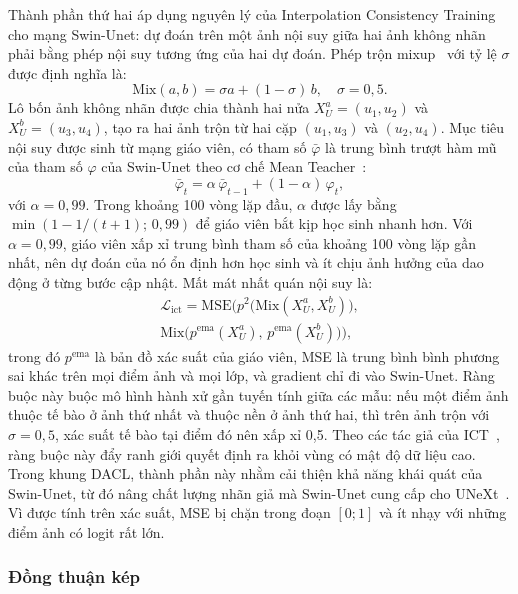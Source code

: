 \documentclass{IEEEtran}
\newcommand{\Lx}[1]{\mathcal{L}_{\mathrm{#1}}}
\newcommand{\Mix}{\mathrm{Mix}}
\begin{document}
Thành phần thứ hai áp dụng nguyên lý của Interpolation Consistency Training~\cite{ict} cho mạng Swin-Unet: dự đoán trên một ảnh nội suy giữa hai ảnh không nhãn phải bằng phép nội suy tương ứng của hai dự đoán. Phép trộn mixup~\cite{mixup} với tỷ lệ $\sigma$ được định nghĩa là:
\begin{equation}
  \Mix(a, b) = \sigma a + (1-\sigma)\, b, \quad \sigma = 0{,}5. \label{eq:mix}
\end{equation}
Lô bốn ảnh không nhãn được chia thành hai nửa $X_U^a=(u_1,u_2)$ và $X_U^b=(u_3,u_4)$, tạo ra hai ảnh trộn từ hai cặp $(u_1,u_3)$ và $(u_2,u_4)$. Mục tiêu nội suy được sinh từ mạng giáo viên, có tham số $\bar{\varphi}$ là trung bình trượt hàm mũ của tham số $\varphi$ của Swin-Unet theo cơ chế Mean Teacher~\cite{mt}:
\begin{equation}
  \bar{\varphi}_t = \alpha\,\bar{\varphi}_{t-1} + (1-\alpha)\,\varphi_t, \label{eq:ema}
\end{equation}
với $\alpha=0{,}99$. Trong khoảng 100 vòng lặp đầu, $\alpha$ được lấy bằng $\min(1-1/(t+1);\,0{,}99)$ để giáo viên bắt kịp học sinh nhanh hơn. Với $\alpha=0{,}99$, giáo viên xấp xỉ trung bình tham số của khoảng 100 vòng lặp gần nhất, nên dự đoán của nó ổn định hơn học sinh và ít chịu ảnh hưởng của dao động ở từng bước cập nhật. Mất mát nhất quán nội suy là:
\begin{multline}
  \Lx{ict} = \mathrm{MSE}\Big(p^{2}\big(\Mix(X_U^a, X_U^b)\big),\\
  \Mix\big(p^{\mathrm{ema}}(X_U^a),\, p^{\mathrm{ema}}(X_U^b)\big)\Big), \label{eq:ict}
\end{multline}
trong đó $p^{\mathrm{ema}}$ là bản đồ xác suất của giáo viên, MSE là trung bình bình phương sai khác trên mọi điểm ảnh và mọi lớp, và gradient chỉ đi vào Swin-Unet. Ràng buộc này buộc mô hình hành xử gần tuyến tính giữa các mẫu: nếu một điểm ảnh thuộc tế bào ở ảnh thứ nhất và thuộc nền ở ảnh thứ hai, thì trên ảnh trộn với $\sigma=0{,}5$, xác suất tế bào tại điểm đó nên xấp xỉ 0,5. Theo các tác giả của ICT~\cite{ict}, ràng buộc này đẩy ranh giới quyết định ra khỏi vùng có mật độ dữ liệu cao. Trong khung DACL, thành phần này nhằm cải thiện khả năng khái quát của Swin-Unet, từ đó nâng chất lượng nhãn giả mà Swin-Unet cung cấp cho UNeXt~\cite{dacl}. Vì được tính trên xác suất, MSE bị chặn trong đoạn $[0;1]$ và ít nhạy với những điểm ảnh có logit rất lớn.

\subsubsection{Đồng thuận kép}
\end{document}
